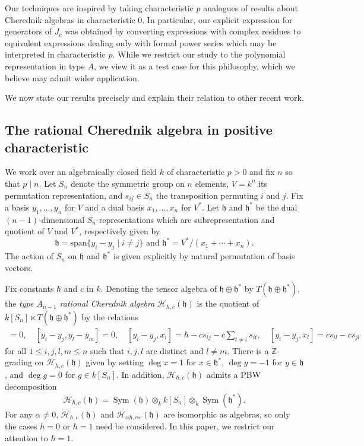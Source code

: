 \documentclass{elsarticle}
\numberwithin{equation}{section}
\theoremstyle{definition}
\newcommand{\ZZ}{\mathbb{Z}}
\newcommand{\h}{\mathfrak{h}}
\newcommand{\HH}{\mathcal{H}}
\newcommand{\Sym}{\operatorname{Sym}}
\newcommand{\sspan}{\text{span}}
\begin{document}
Our techniques are inspired by taking characteristic $p$ analogues of results about Cherednik algebras in characteristic $0$.  In particular, our explicit expression for generators of $J_c$ was obtained by converting expressions with complex residues to equivalent expressions dealing only with formal power series which may be interpreted in characteristic $p$.  While we restrict our study to the polynomial representation in type $A$, we view it as a test case for this philosophy, which we believe may admit wider application.

We now state our results precisely and explain their relation to other recent work.

\subsection{The rational Cherednik algebra in positive characteristic}

We work over an algebraically closed field $k$ of characteristic $p > 0$ and fix $n$ so that $p \mid n$.  Let $S_n$ denote the symmetric group on $n$ elements, $V = k^n$ its permutation representation, and $s_{ij} \in S_n$ the transposition permuting $i$ and $j$.  Fix a basis $y_1,\ldots,y_{n}$ for $V$ and a dual basis $x_1, \ldots, x_{n}$ for $V^*$.  Let $\h$ and $\h^*$ be the dual $(n - 1)$-dimensional $S_n$-representations which are subrepresentation and quotient of $V$ and $V^*$, respectively given by
\[
\h = \sspan\{y_i - y_j \mid i \neq j\} \text{ and } \h^* = V^*/(x_1 + \cdots + x_{n}).
\]
The action of $S_n$ on $\h$ and $\h^*$ is given explicitly by natural permutation of basis vectors.

Fix constants $\hbar$ and $c$ in $k$.  Denoting the tensor algebra of $\h \oplus \h^*$ by $T(\h \oplus \h^*)$, the \textit{type $A_{n - 1}$ rational Cherednik algebra} $\HH_{\hbar, c}(\h)$ is the quotient of $k[S_n] \ltimes T(\h \oplus \h^*)$ by the relations
\begin{align*}
[x_i,x_j]=0, \quad [y_i-y_j,y_l-y_m] = 0, \quad [y_i-y_j,x_i] = \hbar- cs_{ij}-c \sum_{t \ne i} s_{it},\quad [y_i-y_j,x_l] =cs_{il}-cs_{jl}\end{align*}
for all $1 \le i , j, l, m \le n$ such that $i,j,l$ are distinct and $l \neq m$. There is a $\ZZ$-grading on $\HH_{\hbar,c}(\h)$ given by setting $\deg x=1$ for $x \in \h^*$, $\deg y = -1$ for $y \in \h$, and $\deg g=0$ for $g \in k[S_n]$.  In addition, $\HH_{\hbar, c}(\h)$ admits a PBW decomposition 
\[
\HH_{\hbar,c}(\h) = \Sym(\h) \otimes_k k[S_n] \otimes_k \Sym(\h^*).
\]
For any $\alpha \ne 0$, $\HH_{\hbar,c}(\h)$ and $\HH_{\alpha\hbar,\alpha c}(\h)$ are isomorphic as algebras, so only the cases $\hbar = 0$ or $\hbar = 1$ need be considered.  In this paper, we restrict our attention to $\hbar = 1$.
\end{document}
